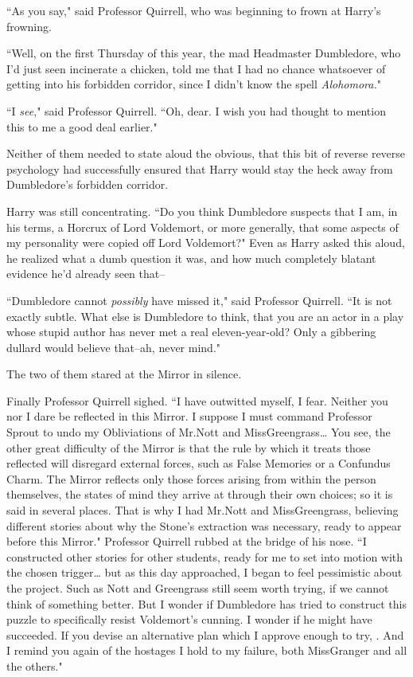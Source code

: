 ``As you say," said Professor Quirrell, who was beginning to frown at Harry's frowning.

``Well, on the first Thursday of this year, the mad Headmaster Dumbledore, who I'd just seen incinerate a chicken, told me that I had no chance whatsoever of getting into his forbidden corridor, since I didn't know the spell \emph{Alohomora.}"

``I \emph{see}," said Professor Quirrell. ``Oh, dear. I wish you had thought to mention this to me a good deal earlier."

Neither of them needed to state aloud the obvious, that this bit of reverse reverse psychology had successfully ensured that Harry would stay the heck away from Dumbledore's forbidden corridor.

Harry was still concentrating. ``Do you think Dumbledore suspects that I am, in his terms, a Horcrux of Lord Voldemort, or more generally, that some aspects of my personality were copied off Lord Voldemort?" Even as Harry asked this aloud, he realized what a dumb question it was, and how much completely blatant evidence he'd already seen that\---

``Dumbledore cannot \emph{possibly} have missed it," said Professor Quirrell. ``It is not exactly subtle. What else is Dumbledore to think, that you are an actor in a play whose stupid author has never met a real eleven-year-old? Only a gibbering dullard would believe that\---ah, never mind."

The two of them stared at the Mirror in silence.

Finally Professor Quirrell sighed. ``I have outwitted myself, I fear. Neither you nor I dare be reflected in this Mirror. I suppose I must command Professor Sprout to undo my Obliviations of Mr.\?Nott and Miss\?Greengrass{\ldots} You see, the other great difficulty of the Mirror is that the rule by which it treats those reflected will disregard external forces, such as False Memories or a Confundus Charm. The Mirror reflects only those forces arising from within the person themselves, the states of mind they arrive at through their own choices; so it is said in several places. That is why I had Mr.\?Nott and Miss\?Greengrass, believing different stories about why the Stone's extraction was necessary, ready to appear before this Mirror." Professor Quirrell rubbed at the bridge of his nose. ``I constructed other stories for other students, ready for me to set into motion with the chosen trigger{\ldots} but as this day approached, I began to feel pessimistic about the project. Such as Nott and Greengrass still seem worth trying, if we cannot think of something better. But I wonder if Dumbledore has tried to construct this puzzle to specifically resist Voldemort's cunning. I wonder if he might have succeeded. If you devise an alternative plan which I approve enough to try, . And I remind you again of the hostages I hold to my failure, both Miss\?Granger and all the others."

